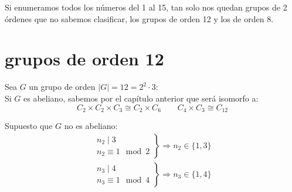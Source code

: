 Si enumeramos todos los números del 1 al 15, tan solo nos quedan grupos de 2 órdenes que no sabemos clasificar, los grupos de orden 12 y los de orden 8.

\section{grupos de orden 12}
Sea $G$ un grupo de orden $|G| = 12 = 2^2 \cdot 3$:\\

\noindent
Si $G$ es abeliano, sabemos por el capítulo anterior que será isomorfo a:
\begin{equation*}
    C_2\times C_2\times C_3 \cong C_2\times C_6 \qquad C_4\times C_3 \cong C_{12}
\end{equation*}

\noindent
Supuesto que $G$ no es abeliano:
\begin{gather*}
    \left.\begin{array}{r}
            n_2 \mid 3 \\
            n_2 \equiv 1 \mod 2
    \end{array}\right\} \Longrightarrow n_2 \in \{1,3\} \\
    \left.\begin{array}{r}
            n_3 \mid 4 \\
            n_3 \equiv 1 \mod 4
    \end{array}\right\} \Longrightarrow n_3 \in \{1,4\}
\end{gather*}

